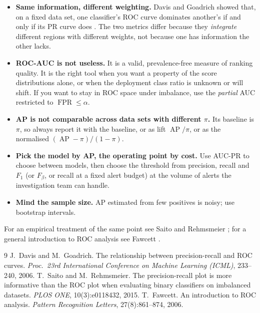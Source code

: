 \documentclass[11pt,a4paper]{article}
\DeclareMathOperator{\FPR}{FPR}
\DeclareMathOperator{\AP}{AP}
\newcommand{\Fone}{F_{1}}
\theoremstyle{plain}
\theoremstyle{definition}
\theoremstyle{remark}
\begin{document}
\begin{itemize}
  \item \textbf{Same information, different weighting.} Davis and Goadrich showed that, on a fixed data set,
        one classifier's ROC curve dominates another's if and only if its PR curve does
        \cite{davis2006}. The two metrics differ because they \emph{integrate} different regions with
        different weights, not because one has information the other lacks.
  \item \textbf{ROC-AUC is not useless.} It is a valid, prevalence-free measure of ranking quality. It is the
        right tool when you want a property of the score distributions alone, or when the deployment
        class ratio is unknown or will shift. If you want to stay in ROC space under imbalance, use the
        \emph{partial} AUC restricted to $\FPR\le\alpha$.
  \item \textbf{AP is not comparable across data sets with different $\pi$.} Its baseline is $\pi$, so always
        report it with the baseline, or as lift $\AP/\pi$, or as the normalised
        $(\AP-\pi)/(1-\pi)$.
  \item \textbf{Pick the model by AP, the operating point by cost.} Use AUC-PR to choose between models, then
        choose the threshold from precision, recall and $\Fone$ (or $F_\beta$, or recall at a fixed alert
        budget) at the volume of alerts the investigation team can handle.
  \item \textbf{Mind the sample size.} AP estimated from few positives is noisy; use bootstrap intervals.
\end{itemize}

For an empirical treatment of the same point see Saito and Rehmsmeier \cite{saito2015}; for a general
introduction to ROC analysis see Fawcett \cite{fawcett2006}.

\begin{thebibliography}{9}
 J.~Davis and M.~Goadrich. The relationship between precision-recall and ROC curves.
  \emph{Proc.\ 23rd International Conference on Machine Learning (ICML)}, 233--240, 2006.
 T.~Saito and M.~Rehmsmeier. The precision-recall plot is more informative than the ROC
  plot when evaluating binary classifiers on imbalanced datasets. \emph{PLOS ONE}, 10(3):e0118432, 2015.
 T.~Fawcett. An introduction to ROC analysis. \emph{Pattern Recognition Letters},
  27(8):861--874, 2006.
\end{thebibliography}
\end{document}
